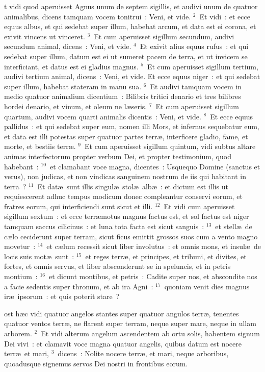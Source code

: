 \bchapter
{}t vidi quod aperuisset Agnus unum de septem sigillis, et audivi unum de quatuor animalibus, dicens tamquam vocem tonitrui~: Veni, et vide.
${}^{2}$~Et vidi~: et ecce equus albus, et qui sedebat super illum, habebat arcum, et data est ei corona, et exivit vincens ut vinceret.
${}^{3}$~Et cum aperuisset sigillum secundum, audivi secundum animal, dicens~: Veni, et vide.
${}^{4}$~Et exivit alius equus rufus~: et qui sedebat super illum, datum est ei ut sumeret pacem de terra, et ut invicem se interficiant, et datus est ei gladius magnus.
${}^{5}$~Et cum aperuisset sigillum tertium, audivi tertium animal, dicens~: Veni, et vide. Et ecce equus niger~: et qui sedebat super illum, habebat stateram in manu sua.
${}^{6}$~Et audivi tamquam vocem in medio quatuor animalium dicentium~: Bilibris tritici denario et tres bilibres hordei denario, et vinum, et oleum ne l\ae seris.
${}^{7}$~Et cum aperuisset sigillum quartum, audivi vocem quarti animalis dicentis~: Veni, et vide.
${}^{8}$~Et ecce equus pallidus~: et qui sedebat super eum, nomen illi Mors, et infernus sequebatur eum, et data est illi potestas super quatuor partes terr\ae , interficere gladio, fame, et morte, et bestiis terr\ae .
${}^{9}$~Et cum aperuisset sigillum quintum, vidi subtus altare animas interfectorum propter verbum Dei, et propter testimonium, quod habebant~:
${}^{10}$~et clamabant voce magna, dicentes~: Usquequo Domine (sanctus et verus), non judicas, et non vindicas sanguinem nostrum de iis qui habitant in terra~?
${}^{11}$~Et dat\ae\ sunt illis singul\ae\ stol\ae\ alb\ae~: et dictum est illis ut requiescerent adhuc tempus modicum donec compleantur conservi eorum, et fratres eorum, qui interficiendi sunt sicut et illi.
${}^{12}$~Et vidi cum aperuisset sigillum sextum~: et ecce terr\ae motus magnus factus est, et sol factus est niger tamquam saccus cilicinus~: et luna tota facta est sicut sanguis~:
${}^{13}$~et stell\ae\ de c\ae lo ceciderunt super terram, sicut ficus emittit grossos suos cum a vento magno movetur~:
${}^{14}$~et c\ae lum recessit sicut liber involutus~: et omnis mons, et insul\ae\ de locis suis mot\ae\ sunt~:
${}^{15}$~et reges terr\ae , et principes, et tribuni, et divites, et fortes, et omnis servus, et liber absconderunt se in speluncis, et in petris montium~:
${}^{16}$~et dicunt montibus, et petris~: Cadite super nos, et abscondite nos a facie sedentis super thronum, et ab ira Agni~:
${}^{17}$~quoniam venit dies magnus ir\ae\ ipsorum~: et quis poterit stare~?

\bchapter
{}ost h\ae c vidi quatuor angelos stantes super quatuor angulos terr\ae , tenentes quatuor ventos terr\ae , ne flarent super terram, neque super mare, neque in ullam arborem.
${}^{2}$~Et vidi alterum angelum ascendentem ab ortu solis, habentem signum Dei vivi~: et clamavit voce magna quatuor angelis, quibus datum est nocere terr\ae\ et mari,
${}^{3}$~dicens~: Nolite nocere terr\ae , et mari, neque arboribus, quoadusque signemus servos Dei nostri in frontibus eorum.


